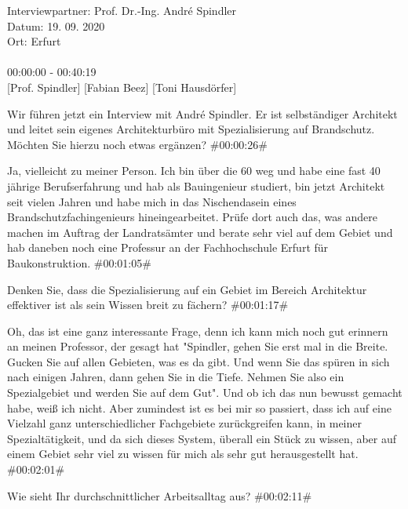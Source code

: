Interviewpartner: Prof. Dr.-Ing. André Spindler\\
Datum: 19. 09. 2020\\
Ort: Erfurt\\\\
00:00:00 - 00:40:19\\

\footnotesize
{}[Prof. Spindler]
[Fabian Beez]
[Toni Hausdörfer]
\addtolength{\transcriptlen}{1em}

\begin{description}

\Fabian Wir führen jetzt ein Interview mit André Spindler. Er ist selbständiger Architekt und leitet sein eigenes Architekturbüro mit Spezialisierung auf Brandschutz. Möchten Sie hierzu noch etwas ergänzen? \#00:00:26\#

\Andre Ja, vielleicht zu meiner Person. Ich bin über die 60 weg und habe eine fast 40 jährige Berufserfahrung und hab als Bauingenieur studiert, bin jetzt Architekt seit vielen Jahren und habe mich in das Nischendasein eines Brandschutzfachingenieurs hineingearbeitet. Prüfe dort auch das, was andere machen im Auftrag der Landratsämter und berate sehr viel auf dem Gebiet und hab daneben noch eine Professur an der Fachhochschule Erfurt für Baukonstruktion. \#00:01:05\#

\Fabian Denken Sie, dass die Spezialisierung auf ein Gebiet im Bereich Architektur effektiver ist als sein Wissen breit zu fächern? \#00:01:17\#

\Andre Oh, das ist eine ganz interessante Frage, denn ich kann mich noch gut erinnern an meinen Professor, der gesagt hat "Spindler, gehen Sie erst mal in die Breite. Gucken Sie auf allen Gebieten, was es da gibt. Und wenn Sie das spüren in sich nach einigen Jahren, dann gehen Sie in die Tiefe. Nehmen Sie also ein Spezialgebiet und werden Sie auf dem Gut". Und ob ich das nun bewusst gemacht habe, weiß ich nicht. Aber zumindest ist es bei mir so passiert, dass ich auf eine Vielzahl ganz unterschiedlicher Fachgebiete zurückgreifen kann, in meiner Spezialtätigkeit, und da sich dieses System, überall ein Stück zu wissen, aber auf einem Gebiet sehr viel zu wissen für mich als sehr gut herausgestellt hat. \#00:02:01\#

\Fabian Wie sieht Ihr durchschnittlicher Arbeitsalltag aus? \#00:02:11\#


\end{description}
